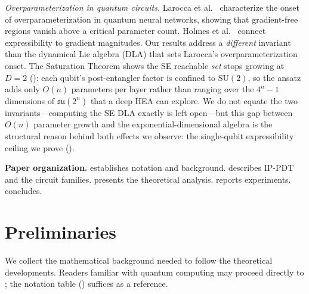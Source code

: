 \documentclass[11pt]{article}
\newcommand{\SU}{\mathrm{SU}}
\theoremstyle{plain}
\theoremstyle{plain}
\begin{document}
\textit{Overparameterization in quantum circuits.}
Larocca et al.~\cite{larocca2023theory} characterize the onset of
overparameterization in quantum neural networks, showing that
gradient-free regions vanish above a critical parameter count.
Holmes et al.~\cite{holmes2022connecting} connect expressibility to
gradient magnitudes.  Our results address a \emph{different} invariant
than the dynamical Lie algebra (DLA) that sets Larocca's
overparameterization onset.  The Saturation Theorem shows the SE
reachable \emph{set} stops growing at $D=2$ ():
each qubit's post-entangler factor is confined to $\SU(2)$, so the
ansatz adds only $O(n)$ parameters per layer rather than ranging over the
$4^n-1$ dimensions of $\mathfrak{su}(2^n)$ that a deep HEA can explore.
We do not equate the two invariants---computing the SE DLA exactly is
left open---but this gap between $O(n)$ parameter growth and the
exponential-dimensional algebra is the structural reason
behind both effects we observe: the single-qubit expressibility ceiling
we prove ().

\medskip\noindent\textbf{Paper organization.}
 establishes notation and background.
 describes IP-PDT and the circuit families.
 presents the theoretical analysis.
 reports experiments.
 concludes.
\section{Preliminaries}\label{sec:prelim}
We collect the mathematical background needed to follow the
theoretical developments.  Readers familiar with quantum computing
may proceed directly to ; the notation table
() suffices as a reference.
\end{document}
